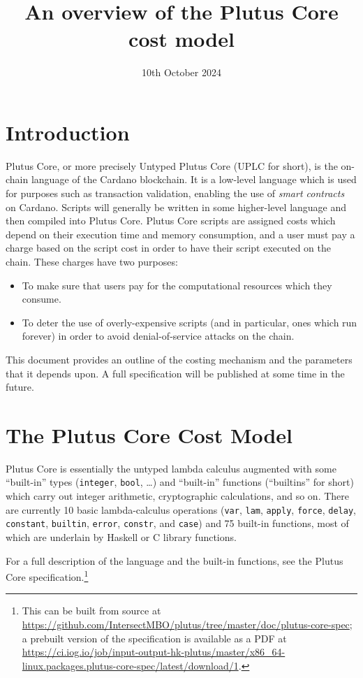 \documentclass[a4paper]{article}
\title{An overview of the Plutus Core cost model\\
}
\date{10th October 2024}
\begin{document}
\maketitle

\section{Introduction}
Plutus Core, or more precisely Untyped Plutus Core (UPLC for short), is the
on-chain language of the Cardano blockchain.  It is a low-level language which
is used for purposes such as transaction validation, enabling the use of
\textit{smart contracts} on Cardano.  Scripts will generally be written in some
higher-level language and then compiled into Plutus Core.  Plutus Core scripts
are assigned costs which depend on their execution time and memory consumption,
and a user must pay a charge based on the script cost in order to have their
script executed on the chain.  These charges have two purposes:

\begin{itemize}
\item To make sure that users pay for the computational resources which they consume.
\item To deter the use of overly-expensive scripts (and in particular, ones
  which run forever) in order to avoid denial-of-service attacks on the chain.
\end{itemize}

\noindent This document provides an outline of the costing mechanism and the
parameters that it depends upon.  A full specification will be published at some
time in the future.


\section{The Plutus Core Cost Model}
Plutus Core is essentially the untyped lambda calculus augmented with some
``built-in'' types (\texttt{integer}, \texttt{bool}, \ldots) and ``built-in''
functions (``builtins'' for short) which carry out integer arithmetic,
cryptographic calculations, and so on.  There are currently 10 basic
lambda-calculus operations (\texttt{var}, \texttt{lam}, \texttt{apply},
\texttt{force}, \texttt{delay}, \texttt{constant}, \texttt{builtin},
\texttt{error}, \texttt{constr}, and \texttt{case}) and 75 built-in
functions, most of which are underlain by Haskell or C library functions.

For a full description of the language and the built-in functions, see the
Plutus Core specification.\footnote{This can be built from source at
\url{https://github.com/IntersectMBO/plutus/tree/master/doc/plutus-core-spec}; a
prebuilt version of the specification is available as a PDF at
\url{https://ci.iog.io/job/input-output-hk-plutus/master/x86_64-linux.packages.plutus-core-spec/latest/download/1}.}
\end{document}
